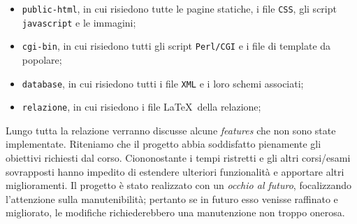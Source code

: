 \begin{itemize}

	\item \texttt{public-html}, in cui risiedono tutte le pagine statiche, i file \texttt{CSS}, gli script \texttt{javascript} e le immagini;
	\item \texttt{cgi-bin}, in cui risiedono tutti gli script \texttt{Perl/CGI} e i file di template da popolare;
	\item \texttt{database}, in cui risiedono tutti i file \texttt{XML} e i loro schemi associati;
	\item \texttt{relazione}, in cui risiedono i file \LaTeX\ della relazione;

\end{itemize}
Lungo tutta la relazione verranno discusse alcune \textit{features} che non sono state implementate. Riteniamo che il progetto abbia soddisfatto pienamente gli obiettivi richiesti dal corso. Ciononostante i tempi ristretti e gli altri corsi/esami sovrapposti hanno impedito di estendere ulteriori funzionalità e apportare altri miglioramenti. Il progetto è stato realizzato con un \textit{occhio al futuro}, focalizzando l'attenzione sulla manutenibilità; pertanto se in futuro esso venisse raffinato e migliorato, le modifiche richiederebbero una manutenzione non troppo onerosa.